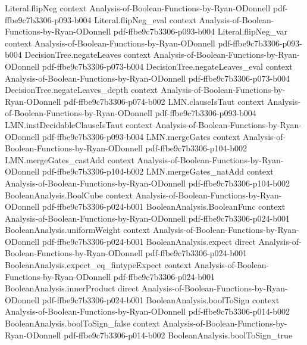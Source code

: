 \begin{theorem}
\proofstep
  {Literal.flipNeg}
  {context}
  {Analysis-of-Boolean-Functions-by-Ryan-ODonnell}
  {pdf-ffbe9c7b3306-p093-b004}
\proofstep
  {Literal.flipNeg_eval}
  {context}
  {Analysis-of-Boolean-Functions-by-Ryan-ODonnell}
  {pdf-ffbe9c7b3306-p093-b004}
\proofstep
  {Literal.flipNeg_var}
  {context}
  {Analysis-of-Boolean-Functions-by-Ryan-ODonnell}
  {pdf-ffbe9c7b3306-p093-b004}
\proofstep
  {DecisionTree.negateLeaves}
  {context}
  {Analysis-of-Boolean-Functions-by-Ryan-ODonnell}
  {pdf-ffbe9c7b3306-p073-b004}
\proofstep
  {DecisionTree.negateLeaves_eval}
  {context}
  {Analysis-of-Boolean-Functions-by-Ryan-ODonnell}
  {pdf-ffbe9c7b3306-p073-b004}
\proofstep
  {DecisionTree.negateLeaves_depth}
  {context}
  {Analysis-of-Boolean-Functions-by-Ryan-ODonnell}
  {pdf-ffbe9c7b3306-p074-b002}
\proofstep
  {LMN.clauseIsTaut}
  {context}
  {Analysis-of-Boolean-Functions-by-Ryan-ODonnell}
  {pdf-ffbe9c7b3306-p093-b004}
\proofstep
  {LMN.instDecidableClauseIsTaut}
  {context}
  {Analysis-of-Boolean-Functions-by-Ryan-ODonnell}
  {pdf-ffbe9c7b3306-p093-b004}
\proofstep
  {LMN.mergeGates}
  {context}
  {Analysis-of-Boolean-Functions-by-Ryan-ODonnell}
  {pdf-ffbe9c7b3306-p104-b002}
\proofstep
  {LMN.mergeGates_castAdd}
  {context}
  {Analysis-of-Boolean-Functions-by-Ryan-ODonnell}
  {pdf-ffbe9c7b3306-p104-b002}
\proofstep
  {LMN.mergeGates_natAdd}
  {context}
  {Analysis-of-Boolean-Functions-by-Ryan-ODonnell}
  {pdf-ffbe9c7b3306-p104-b002}
\proofstep
  {BooleanAnalysis.BoolCube}
  {context}
  {Analysis-of-Boolean-Functions-by-Ryan-ODonnell}
  {pdf-ffbe9c7b3306-p024-b001}
\proofstep
  {BooleanAnalysis.BooleanFunc}
  {context}
  {Analysis-of-Boolean-Functions-by-Ryan-ODonnell}
  {pdf-ffbe9c7b3306-p024-b001}
\proofstep
  {BooleanAnalysis.uniformWeight}
  {context}
  {Analysis-of-Boolean-Functions-by-Ryan-ODonnell}
  {pdf-ffbe9c7b3306-p024-b001}
\proofstep
  {BooleanAnalysis.expect}
  {direct}
  {Analysis-of-Boolean-Functions-by-Ryan-ODonnell}
  {pdf-ffbe9c7b3306-p024-b001}
\proofstep
  {BooleanAnalysis.expect_eq_fintypeExpect}
  {context}
  {Analysis-of-Boolean-Functions-by-Ryan-ODonnell}
  {pdf-ffbe9c7b3306-p024-b001}
\proofstep
  {BooleanAnalysis.innerProduct}
  {direct}
  {Analysis-of-Boolean-Functions-by-Ryan-ODonnell}
  {pdf-ffbe9c7b3306-p024-b001}
\proofstep
  {BooleanAnalysis.boolToSign}
  {context}
  {Analysis-of-Boolean-Functions-by-Ryan-ODonnell}
  {pdf-ffbe9c7b3306-p014-b002}
\proofstep
  {BooleanAnalysis.boolToSign_false}
  {context}
  {Analysis-of-Boolean-Functions-by-Ryan-ODonnell}
  {pdf-ffbe9c7b3306-p014-b002}
\proofstep
  {BooleanAnalysis.boolToSign_true}

\end{theorem}
